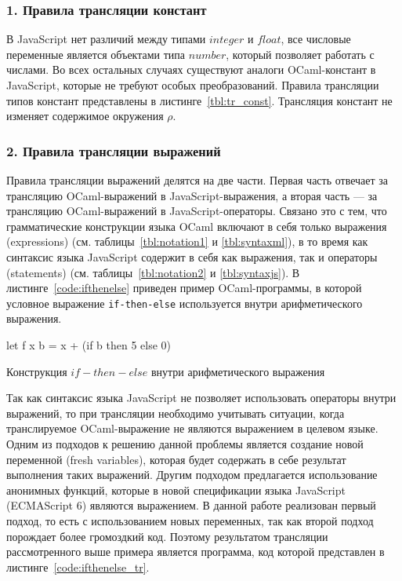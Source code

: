 \subsubsection*{1. Правила трансляции констант}

В JavaScript нет различий между типами $integer$ и $float$, все числовые переменные является объектами типа $number$, который позволяет работать с числами. Во всех остальных случаях существуют аналоги OCaml-констант в JavaScript, которые не требуют особых преобразований. Правила трансляции типов констант представлены в листинге~\ref{tbl:tr_const}. Трансляция констант не изменяет содержимое окружения $\rho$.

\subsubsection*{2. Правила трансляции выражений}

 Правила трансляции выражений делятся на две части. Первая часть отвечает за трансляцию OCaml-выражений в JavaScript-выражения, а вторая часть --- за трансляцию OCaml-выражений в JavaScript-операторы. Связано это с тем, что грамматические конструкции языка OCaml включают в себя только выражения (expressions) (см. таблицы~\ref{tbl:notation1} и \ref{tbl:syntaxml}), в то время как синтаксис языка JavaScript содержит в себя как выражения, так и операторы (statements) (см. таблицы~\ref{tbl:notation2} и \ref{tbl:syntaxjs}). В листинге~\ref{code:ifthenelse} приведен пример OCaml-программы, в которой условное выражение \verb|if-then-else| используется внутри арифметического выражения. 

\begin{listing}
\begin{pyglist}[language=ocaml,numbers=none,numbersep=5pt, fontsize=\small]
let f x b = x + (if b then 5 else 0)
\end{pyglist}
\caption{Конструкция $if-then-else$ внутри арифметического выражения}
\label{code:ifthenelse}
\end{listing}

Так как синтаксис языка JavaScript не позволяет использовать операторы внутри выражений, то при трансляции необходимо учитывать ситуации, когда транслируемое OCaml-выражение не являются выражением в целевом языке. Одним из подходов к решению данной проблемы является создание новой переменной (fresh variables), которая будет содержать в себе результат выполнения таких выражений. Другим подходом предлагается использование анонимных функций, которые в новой спецификации языка JavaScript (ECMAScript 6) являются выражением. В данной работе реализован первый подход, то есть с использованием новых переменных, так как второй подход порождает более громоздкий код. Поэтому результатом трансляции рассмотренного выше примера является программа, код которой представлен в листинге~\ref{code:ifthenelse_tr}.

